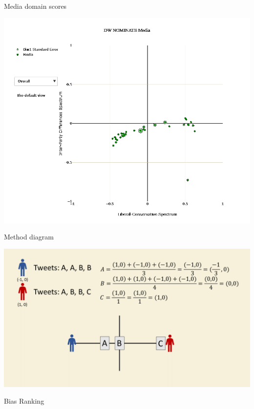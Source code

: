 \documentclass[12pt]{article}
\theoremstyle{example}
\theoremstyle{defn}
\begin{document}
\clearpage

{\large Media domain scores}

\vspace*{-5pt}
\hspace*{\fill}
\includegraphics[scale=0.2]{media_pic_white.png}
\hspace*{\fill}

\clearpage

Method diagram

\vspace*{-10pt}
\hspace*{\fill}
\includegraphics[scale=0.25]{method_visual2.png}
\hspace*{\fill}

\clearpage

Bias Ranking
\end{document}

